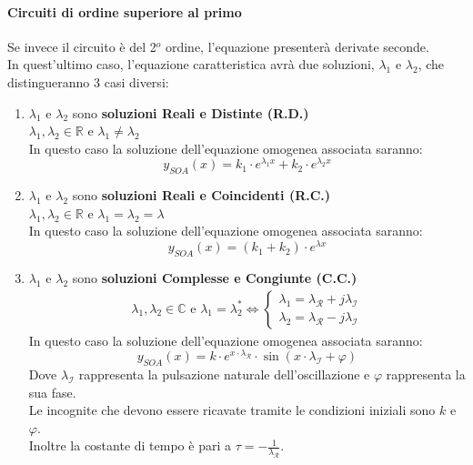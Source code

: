 \documentclass[../main.tex]{subfiles}
\begin{document}
	\paragraph{Circuiti di ordine superiore al primo}
	Se invece il circuito è del 2$^o$ ordine, l’equazione presenterà derivate seconde.\\
	In quest’ultimo caso, l’equazione caratteristica avrà due soluzioni, $\lambda_1$ e $\lambda_2$, che distingueranno 3 casi
	diversi:
	\begin{enumerate}
		\item $\lambda_1$ e $\lambda_2$ sono \textbf{soluzioni Reali e Distinte (R.D.)}\\
		$\lambda_1, \lambda_2 \in \mathbb{R}$ e $\lambda_1 \neq \lambda_2$\\
		In questo caso la soluzione dell'equazione omogenea associata saranno:
		\begin{equation}
			y_{SOA}(x) = k_1 \cdot e^{\lambda_1 x} + k_2 \cdot e^{\lambda_2 x}
		\end{equation}
		\item $\lambda_1$ e $\lambda_2$ sono \textbf{soluzioni Reali e Coincidenti (R.C.)}\\
		$\lambda_1, \lambda_2 \in \mathbb{R}$ e $\lambda_1 = \lambda_2 = \lambda$\\
		In questo caso la soluzione dell'equazione omogenea associata saranno:
		\begin{equation}
			y_{SOA}(x) = (k_1 + k_2) \cdot e^{\lambda x}
		\end{equation}
		\item $\lambda_1$ e $\lambda_2$ sono \textbf{soluzioni Complesse e Congiunte (C.C.)}\\
		\begin{align}
			\lambda_1, \lambda_2 \in \mathbb{C} \text{ e } \lambda_1 = \lambda_2^* \Leftrightarrow \begin{cases}
				\lambda_1 = \lambda_{\mathcal{R}} + j \lambda_{\mathcal{I}} \\
				\lambda_2 = \lambda_{\mathcal{R}} - j \lambda_{\mathcal{I}}
			\end{cases}
		\end{align}
		In questo caso la soluzione dell'equazione omogenea associata saranno:
		\begin{equation}
			y_{SOA}(x) = k \cdot e^{x \cdot \lambda_{\mathcal{R}}} \cdot \sin(x \cdot \lambda_{\mathcal{I}} + \varphi)
		\end{equation}
		Dove $\lambda_{\mathcal{I}}$ rappresenta la pulsazione naturale dell'oscillazione e $\varphi$ rappresenta la sua fase.\\
		Le incognite che devono essere ricavate tramite le condizioni iniziali sono $k$ e $\varphi$.\\
		Inoltre la costante di tempo è pari a $\tau = - \frac{1}{\lambda_{\mathcal{R}}}$.
	\end{enumerate}
\end{document}
